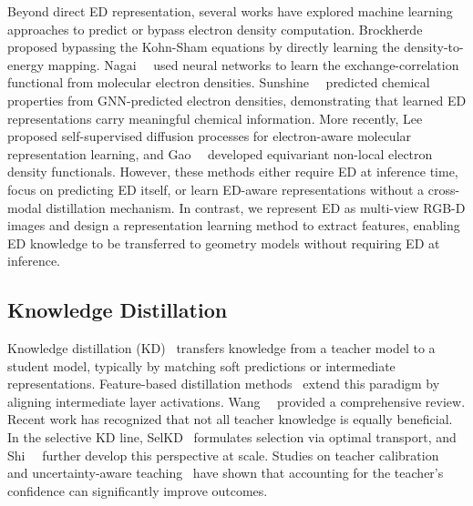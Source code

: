 Beyond direct ED representation, several works have explored machine learning approaches to predict or bypass electron density computation. Brockherde~\etal~\cite{brockherde2017bypassing} proposed bypassing the Kohn-Sham equations by directly learning the density-to-energy mapping. Nagai~\etal~\cite{nagai2020completing} used neural networks to learn the exchange-correlation functional from molecular electron densities. Sunshine~\etal~\cite{sunshine2023chemical} predicted chemical properties from GNN-predicted electron densities, demonstrating that learned ED representations carry meaningful chemical information. More recently, Lee~\etal~\cite{lee2025selfsupervised} proposed self-supervised diffusion processes for electron-aware molecular representation learning, and Gao~\etal~\cite{gao2025equivariant} developed equivariant non-local electron density functionals. However, these methods either require ED at inference time, focus on predicting ED itself, or learn ED-aware representations without a cross-modal distillation mechanism. %
In contrast, we represent ED as multi-view RGB-D images and design a representation learning method to extract features, enabling ED knowledge to be transferred to geometry models without requiring ED at inference.

\subsection{Knowledge Distillation}

Knowledge distillation (KD)~\cite{hinton2015distilling,gou2021knowledge} transfers knowledge from a teacher model to a student model, typically by matching soft predictions or intermediate representations. Feature-based distillation methods~\cite{romero2015fitnets,zagoruyko2017paying} extend this paradigm by aligning intermediate layer activations. Wang~\etal~\cite{wang2021knowledge} provided a comprehensive review. Recent work has recognized that not all teacher knowledge is equally beneficial. In the selective KD line, SelKD~\cite{park2024selkd} formulates selection via optimal transport, and Shi~\etal~\cite{shi2025selkd} further develop this perspective at scale. Studies on teacher calibration~\cite{guo2017calibration,das2023understanding} and uncertainty-aware teaching~\cite{lin2023teaching,guo2023selective} have shown that accounting for the teacher's confidence can significantly improve outcomes.

